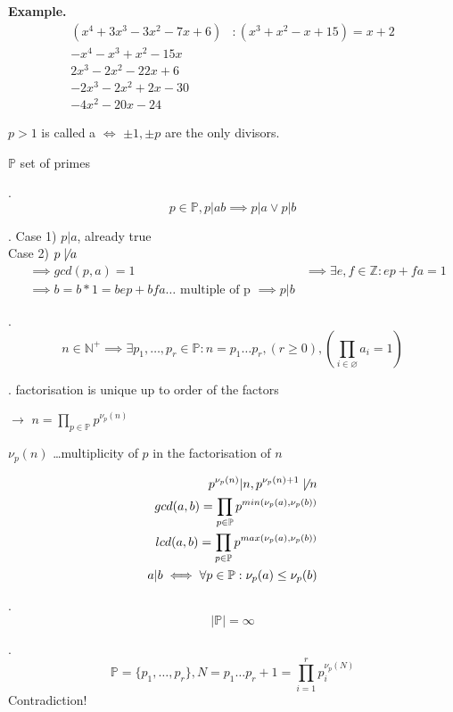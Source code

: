 \textbf{Example.}
\begin{align*}
  (x^4 + 3x^3 - 3x^2 - 7x + 6) &: ( x^3 + x^2 - x + 15) = x+2 \\
  -x^4 - x^3 + x^2 - 15 x \\
  \hline 
    2x^3 - 2x^2 - 22 x + 6 \\
    -2x^3 - 2x^2 + 2 x -30 \\ 
    \hline
      -4x^2 - 20 x - 24
\end{align*}

\begin{definition}
$p>1$ is called a  $\iff$ $\pm 1, \pm p$ are the only divisors.

$\mathbb{P}$ set of primes
\end{definition}

\Theorem.
\[
  p\in \mathbb{P}, p|ab \implies p|a \vee p|b
\]

\Proof.
Case 1) $p|a$, already true\\
Case 2) $p \not\mid a$
\begin{align*}
  &\implies gcd(p,a) = 1 
  &\implies \exists e,f \in \mathbb{Z}: ep + fa = 1 \\
  &\implies b = b*1 = b e p + b f a \ldots \text{ multiple of p } \implies p|b
\end{align*}

\Theorem.
\[
  n \in \mathbb{N}^{+} \implies \exists p_1, \ldots ,p_r \in \mathbb{P}: n = p_1 \ldots p_r, (r \geq 0), (\prod_{i\in \varnothing} a_i = 1)
\]

\Remark.
factorisation is unique up to order of the factors

$\rightarrow$ $n = \prod_{p \in \mathbb{P}} p^{\nu_p(n)}$

$\nu_p(n)$ \ldots multiplicity of $p$ in the factorisation of $n$

\begin{align*}
 p^{\nu_p(n)} | n, p^{\nu_p(n)+1} \not\mid n\\
 gcd(a,b) = \prod_{p \in \mathbb{P}} p ^{min(\nu_p(a), \nu_p(b))} \\
 lcd(a,b) = \prod_{p \in \mathbb{P}} p ^{max(\nu_p(a), \nu_p(b))} \\
 a|b \iff \forall p \in \mathbb{P} : \nu_p(a) \leq \nu_p(b)
\end{align*}

\Theorem.
\[
  | \mathbb{P} | = \infty
\]

\Proof.
\[
  \mathbb{P} = \{p_1, \ldots , p_r\}, N = p_1 \ldots p_r + 1 = \prod_{i=1}^r p_i^{\nu_p(N)}
\]
Contradiction!

